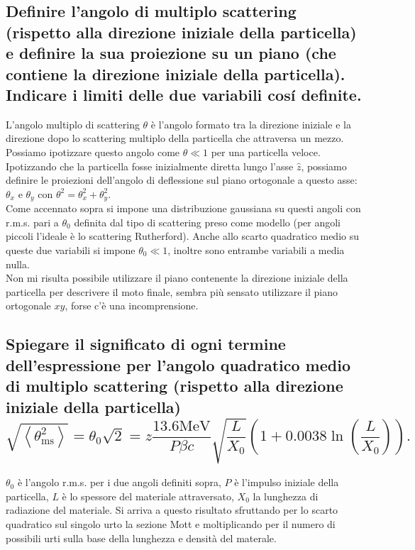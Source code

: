 \subsection[\hspace{1mm} ]{Definire l'angolo di multiplo scattering (rispetto alla direzione iniziale della particella) e definire la sua proiezione su un piano (che contiene la direzione iniziale della particella). Indicare i limiti delle due variabili cosí definite.
}\label{sec:4.a.29}
L'angolo multiplo di scattering $\theta$ è l'angolo formato tra la direzione iniziale e la direzione dopo lo scattering multiplo della particella che attraversa un mezzo. Possiamo ipotizzare questo angolo come $\theta \ll 1$ per una particella veloce.\\
Ipotizzando che la particella fosse inizialmente diretta lungo l'asse $\hat{z}$, possiamo definire le proiezioni dell'angolo di deflessione sul piano ortogonale a questo asse: $\theta_{x}$ e $\theta_{y}$ con $\theta^2=\theta^2_{x}+\theta^2_{y}$.\\
Come accennato sopra si impone una distribuzione gaussiana su questi angoli con r.m.s. pari a $\theta_0$ definita dal tipo di scattering preso come modello (per angoli piccoli l'ideale è lo scattering Rutherford).
Anche allo scarto quadratico medio su queste due variabili si impone $\theta_0\ll 1$, inoltre sono entrambe variabili a media nulla.\\
Non mi risulta possibile utilizzare il piano contenente la direzione iniziale della particella per descrivere il moto finale, sembra più sensato utilizzare il piano ortogonale $xy$, forse c'è una incomprensione.
\subsection[\hspace{1mm} ]{Spiegare il significato di ogni termine dell'espressione per l’angolo quadratico medio di multiplo scattering (rispetto alla direzione iniziale della particella)
\[
\sqrt{\left<\theta^2_{\text{ms}}\right>}=\theta_0\sqrt{2}=z\frac{13.6\text{MeV}}{P\beta c}\sqrt{\frac{L}{X_0}}\left(1+0.0038\ln\left(\frac{L}{X_0}\right)  \right)  
.\] 
}\label{sec:4.a.30}
$\theta_0$ è l'angolo r.m.s. per i due angoli definiti sopra, $P$ è l'impulso iniziale della particella, $L$ è lo spessore del materiale attraversato,  $X_0$ la lunghezza di radiazione del materiale. Si arriva a questo risultato sfruttando per lo scarto quadratico sul singolo urto la sezione Mott e moltiplicando per il numero di possibili urti sulla base della lunghezza e densità del materale.

